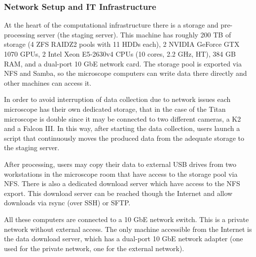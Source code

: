 \subsubsection{Network Setup and IT Infrastructure}
At the heart of the \scilifelab computational infrastructure there is a storage and pre-processing server (the staging server). This machine has roughly 200 TB of storage (4 ZFS RAIDZ2 pools with 11 HDDs each), 2 NVIDIA GeForce GTX 1070 GPUs, 2 Intel Xeon E5-2630v4 CPUs (10 cores, 2.2 GHz, HT), 384 GB RAM, and a dual-port 10 GbE network card. The storage pool is exported via NFS and Samba, so the microscope computers can write data there directly and other machines can access it.

In order to avoid interruption of data collection due to network issues each microscope has their own dedicated storage, that in the case of the Titan microscope is double since it may be connected to two different cameras, a K2 and a Falcon III.  In this way, after starting the data collection, users launch a script that continuously moves the produced data from the adequate storage to the staging server.

After processing, users may  copy their data to external USB drives from two workstations in the microscope room that have access to the storage pool via NFS.
There is also a dedicated download server which have access to the NFS export. This download server can be reached though the Internet and allow downloads via rsync (over SSH) or SFTP. 

All these computers are connected to a 10 GbE network switch. This is a private
network without external access. The only machine accessible from the Internet
is the data download server, which has a dual-port 10 GbE network adapter (one
used for the private network, one for the external network). %

